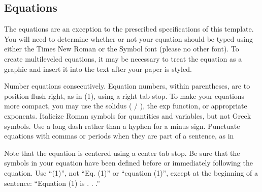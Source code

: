 \documentclass[9pt, conference, a4paper, compsocconf]{IEEEtran}
\begin{document}
\subsection{Equations}
The equations are an exception to the prescribed specifications of this template. You will need to determine whether or not your equation should be typed using either the Times New Roman or the Symbol font (please no other font). To create multileveled equations, it may be necessary to treat the equation as a graphic and insert it into the text after your paper is styled.

Number equations consecutively. Equation numbers, within parentheses, are to position flush right, as in (1), using a right tab stop. To make your equations more compact, you may use the solidus ( / ), the exp function, or appropriate exponents. Italicize Roman symbols for quantities and variables, but not Greek symbols. Use a long dash rather than a hyphen for a minus sign. Punctuate equations with commas or periods when they are part of a sentence, as in

Note that the equation is centered using a center tab stop. Be sure that the symbols in your equation have been defined before or immediately following the equation. Use “(1)”, not “Eq. (1)” or “equation (1)”, except at the beginning of a sentence: “Equation (1) is . . .”
\end{document}
